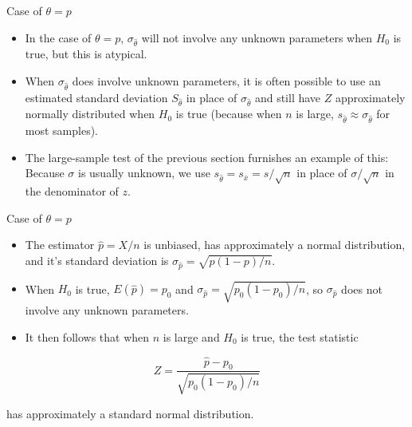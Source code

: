 \documentclass[
  ignorenonframetext,
]{beamer}
\providecommand{\tightlist}{%
  \setlength{\itemsep}{0pt}\setlength{\parskip}{0pt}}\usepackage{longtable,booktabs,array}
\begin{document}
\begin{frame}{Case of \(\theta = p\)}
\protect\hypertarget{case-of-theta-p}{}
\begin{itemize}[<+->]
\tightlist
\item
  In the case of \(\theta = p\), \(\sigma_{\hat{\theta}}\) will not
  involve any unknown parameters when \(H_{0}\) is true, but this is
  atypical.
\item
  When \(\sigma_{\hat{\theta}}\) does involve unknown parameters, it is
  often possible to use an estimated standard deviation
  \(S_{\hat{\theta}}\) in place of \(\sigma_{\hat{\theta}}\) and still
  have \(Z\) approximately normally distributed when \(H_{0}\) is true
  (because when \(n\) is large,
  \(s_{\hat{\theta}} \approx \sigma_{\hat{\theta}}\) for most samples).
\item
  The large-sample test of the previous section furnishes an example of
  this: Because \(\sigma\) is usually unknown, we use
  \(s_{\hat{\theta}} = s_{\bar{x}} = s/\sqrt{n}\) in place of
  \(\sigma/\sqrt{n}\) in the denominator of \(z\).
\end{itemize}
\end{frame}

\begin{frame}{Case of \(\theta = p\)}
\protect\hypertarget{case-of-theta-p-1}{}
\begin{itemize}[<+->]
\tightlist
\item
  The estimator \(\hat{p} = X/n\) is unbiased, has approximately a
  normal distribution, and it's standard deviation is
  \(\sigma_{\hat{p}} = \sqrt{p(1-p)/n}\).
\item
  When \(H_{0}\) is true, \(E(\hat{p}) = p_{0}\) and
  \(\sigma_{\hat{p}} = \sqrt{p_{0}(1-p_{0})/n}\), so
  \(\sigma_{\hat{p}}\) does not involve any unknown parameters.
\item
  It then follows that when \(n\) is large and \(H_{0}\) is true, the
  test statistic
\end{itemize}

\[
Z = \frac{\hat{p} - p_{0}}{\sqrt{p_{0}(1-p_{0})/n}}
\]

has approximately a standard normal distribution.
\end{frame}
\end{document}
